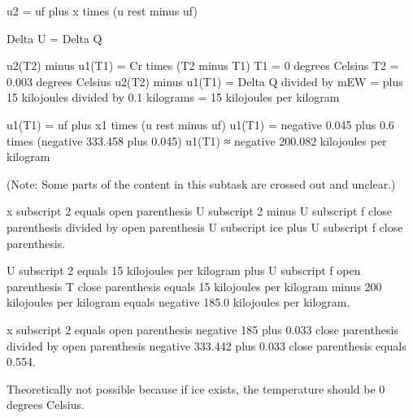 u2 = uf plus x times (u rest minus uf)  

Delta U = Delta Q  

u2(T2) minus u1(T1) = Cr times (T2 minus T1)  
T1 = 0 degrees Celsius  
T2 = 0.003 degrees Celsius  
u2(T2) minus u1(T1) = Delta Q divided by mEW = plus 15 kilojoules divided by 0.1 kilograms = 15 kilojoules per kilogram  

u1(T1) = uf plus x1 times (u rest minus uf)  
u1(T1) = negative 0.045 plus 0.6 times (negative 333.458 plus 0.045)  
u1(T1) ≈ negative 200.082 kilojoules per kilogram  

(Note: Some parts of the content in this subtask are crossed out and unclear.)

x subscript 2 equals open parenthesis U subscript 2 minus U subscript f close parenthesis divided by open parenthesis U subscript ice plus U subscript f close parenthesis.  

U subscript 2 equals 15 kilojoules per kilogram plus U subscript f open parenthesis T close parenthesis equals 15 kilojoules per kilogram minus 200 kilojoules per kilogram equals negative 185.0 kilojoules per kilogram.  

x subscript 2 equals open parenthesis negative 185 plus 0.033 close parenthesis divided by open parenthesis negative 333.442 plus 0.033 close parenthesis equals 0.554.  

Theoretically not possible because if ice exists, the temperature should be 0 degrees Celsius.